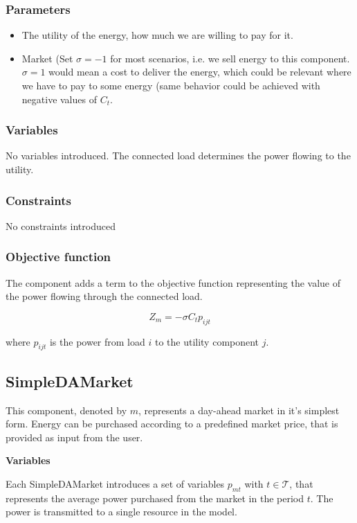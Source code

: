 \documentclass[]{report}
\newcommand{\timesteps}{\mathcal{T}}
\begin{document}
\subsubsection*{Parameters}

\begin{itemize}
    \item [$C_t$] The utility of the energy, how much we are willing to pay for it.
    \item [$\sigma$] Market  (Set $\sigma = -1$ for most scenarios, i.e. we sell energy to this component. $\sigma = 1$ would mean a cost to deliver the energy, which could be relevant where we have to pay to  some energy (same behavior could be achieved with negative values of $C_t$.
\end{itemize}

\subsubsection*{Variables}
No variables introduced. The connected load determines the power flowing to the utility.

\subsubsection*{Constraints}
No constraints introduced

\subsubsection{Objective function}
The component adds a term to the objective function representing the value of the power flowing through the connected load.

\begin{equation}
    Z_m = -\sigma C_t p_{ijt}
\end{equation}

where $p_{ijt}$ is the power from load $i$ to the utility component $j$.

\newpage
\subsection{SimpleDAMarket}
This component, denoted by $m$, represents a day-ahead market in it's simplest form. Energy can be purchased according to a predefined market price, that is provided as input from the user.

\textbf{Variables}

Each SimpleDAMarket introduces a set of variables $p_{mt}$ with $t \in \timesteps$, that represents the average power purchased from the market in the period $t$. The power is transmitted to a single resource in the model.
\end{document}
